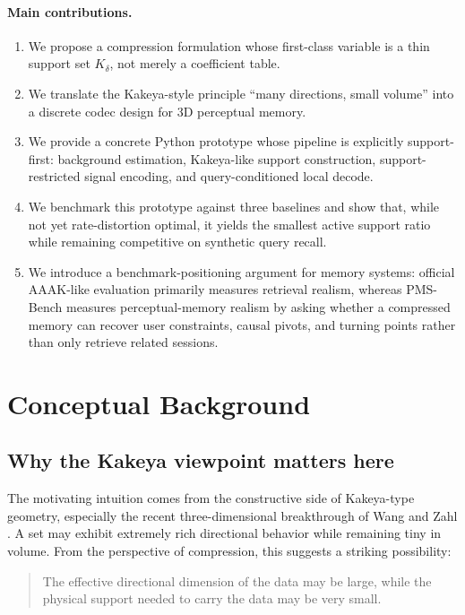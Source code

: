 \documentclass[11pt]{article}
\begin{document}
\paragraph{Main contributions.}
\begin{enumerate}[leftmargin=1.5em]
\item We propose a compression formulation whose first-class variable is a thin support set $K_\delta$, not merely a coefficient table.
\item We translate the Kakeya-style principle ``many directions, small volume'' into a discrete codec design for 3D perceptual memory.
\item We provide a concrete Python prototype whose pipeline is explicitly support-first: background estimation, Kakeya-like support construction, support-restricted signal encoding, and query-conditioned local decode.
\item We benchmark this prototype against three baselines and show that, while not yet rate-distortion optimal, it yields the smallest active support ratio while remaining competitive on synthetic query recall.
\item We introduce a benchmark-positioning argument for memory systems: official AAAK-like evaluation primarily measures retrieval realism, whereas PMS-Bench measures perceptual-memory realism by asking whether a compressed memory can recover user constraints, causal pivots, and turning points rather than only retrieve related sessions.
\end{enumerate}

\section{Conceptual Background}
\subsection{Why the Kakeya viewpoint matters here}
The motivating intuition comes from the constructive side of Kakeya-type geometry, especially the recent three-dimensional breakthrough of Wang and Zahl \cite{wangzahl2025}. A set may exhibit extremely rich directional behavior while remaining tiny in volume. From the perspective of compression, this suggests a striking possibility:
\begin{quote}
The effective directional dimension of the data may be large, while the physical support needed to carry the data may be very small.
\end{quote}
\end{document}
